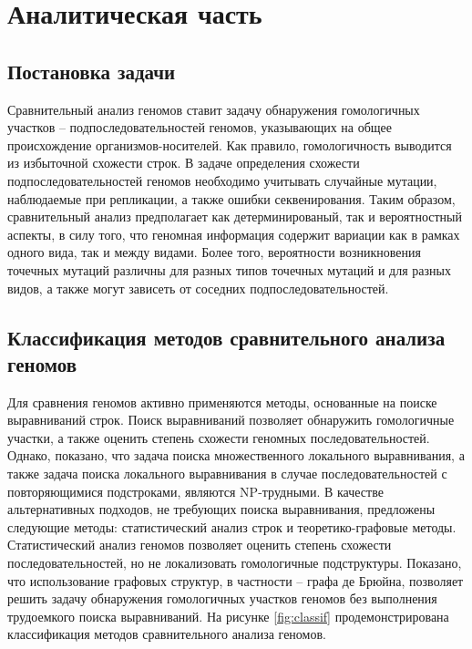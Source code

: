 \section{Аналитическая часть}

\subsection{Постановка задачи}

Сравнительный анализ геномов ставит задачу обнаружения гомологичных участков -- подпоследовательностей геномов, указывающих на общее происхождение\cite{1_hardison2003comparative} организмов-носителей. Как правило, гомологичность выводится из избыточной схожести строк\cite{2_pearson2013introduction}. В задаче определения схожести подпоследовательностей геномов необходимо учитывать случайные мутации, наблюдаемые при репликации, а также ошибки секвенирования. Таким образом, сравнительный анализ предполагает как детерминированый, так и вероятностный аспекты, в силу того, что геномная информация содержит вариации как в рамках одного вида\cite{3_barrick2009genome,4_barnetson2008classification}, так и между видами. Более того, вероятности возникновения точечных мутаций различны для разных типов точечных мутаций\cite{5_zhu2017statistical} и для разных видов\cite{5_zhu2017statistical}, а также могут зависеть от соседних подпоследовательностей\cite{5_zhu2017statistical}.

\subsection{Классификация методов сравнительного анализа геномов}

Для сравнения геномов активно применяются методы, основанные на поиске выравниваний строк\cite{6_altschul1990basic,7_altschul1997gapped,8_thompson1994clustal}. Поиск выравниваний позволяет обнаружить гомологичные участки, а также оценить степень схожести геномных последовательностей. Однако, показано, что задача поиска множественного локального выравнивания, а также задача поиска локального выравнивания в случае последовательностей с повторяющимися подстроками, являются NP-трудными\cite{9_perrey1996fast}. В качестве альтернативных подходов, не требующих поиска выравнивания, предложены следующие методы: статистический анализ строк\cite{10_sarkar2021determination,11_bernard2018k} и теоретико-графовые методы\cite{12_aguero2020graph,13_minkin2017twopaco}. Статистический анализ геномов позволяет оценить степень схожести последовательностей, но не локализовать гомологичные подструктуры. Показано, что использование графовых структур, в частности – графа де Брюйна\cite{13_minkin2017twopaco}, позволяет решить задачу обнаружения гомологичных участков геномов без выполнения трудоемкого поиска выравниваний. На рисунке \ref{fig:classif} продемонстрирована классификация методов сравнительного анализа геномов.

